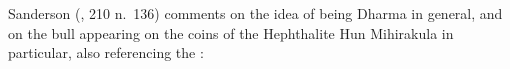
%



%
%

%


\noindent
Sanderson (\citeyear{SandersonTolerance2015}, 210 n.~136) comments
on the idea of  being Dharma
in general, and on the bull appearing on the coins of the 
Hephthalite Hun Mihirakula in particular, also referencing the \VSS: 

